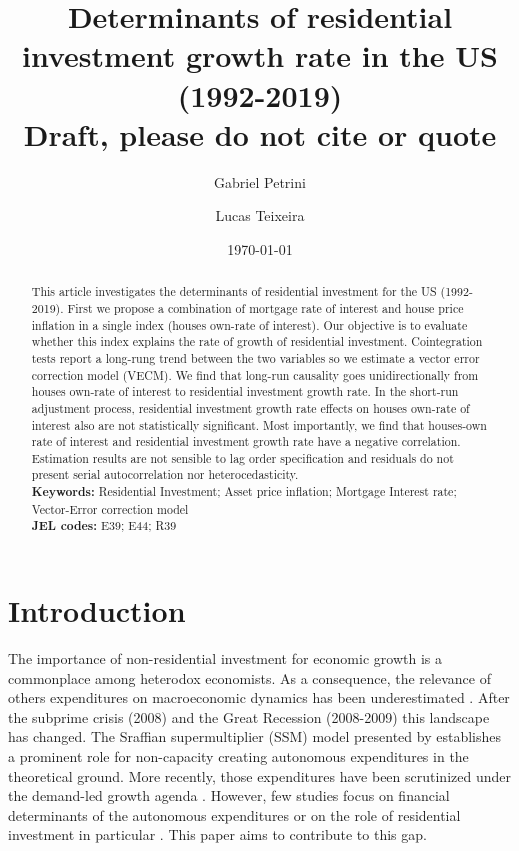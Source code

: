 \documentclass[12pt, a4paper]{article}
\author[1]{Gabriel Petrini}
\affil[1]{PhD Student at University of Campinas (Brazil), Email: \url{gpetrinidasilveira@gmail.com}} %
\author[2]{Lucas Teixeira}
\affil[2]{Assistant Professor at University of Campinas (Brazil), Email: \url{lucastei@unicamp.br}} %
\date{\today}
\title{Determinants of residential investment growth rate in the US (1992-2019)\\\medskip
\large Draft, please do not cite or quote}
\begin{document}
\maketitle



\begin{abstract}
This article investigates the determinants of residential investment for the US (1992-2019).
First we propose a combination of mortgage rate of interest and house price inflation in a single index (houses own-rate of interest).
Our objective is to evaluate whether this index explains the rate of growth of residential investment.
Cointegration tests report a long-rung trend between the two variables so we estimate a vector error correction model (VECM).
We find that long-run causality goes unidirectionally from houses own-rate of interest to residential investment growth rate.
In the short-run adjustment process, residential investment growth rate effects on houses own-rate of interest also are not statistically significant.
Most importantly, we find that houses-own rate of interest and residential investment growth rate have a negative correlation.
Estimation results are not sensible to lag order specification and residuals do not present serial autocorrelation nor heterocedasticity.
\\
\noindent \textbf{Keywords:} Residential Investment; Asset price inflation; Mortgage Interest rate; Vector-Error correction model\\
\noindent \textbf{JEL codes:} E39; E44; R39
\end{abstract}


\section{Introduction}
\label{sec:orgf55e3ac}
\label{sec:Introduction}
The importance of non-residential investment for economic growth is a commonplace among heterodox economists.
As a consequence, the relevance of others expenditures on macroeconomic dynamics has been underestimated \cite{brochier_macroeconomics_2017}.
After the subprime crisis (2008) and the Great Recession (2008-2009) this landscape has changed.
The Sraffian supermultiplier (SSM) model presented by \textcite{serrano_long_1995} establishes a prominent role for non-capacity creating autonomous expenditures in the theoretical ground.
More recently, those expenditures have been scrutinized under the demand-led growth agenda \cites{freitas_pattern_2013}{girardi_long-run_2016}{girardi_autonomous_2018}{braga_investment_2018}.
However, few studies focus on financial determinants of the autonomous expenditures or on the role of residential investment in particular \cites{petrini_2021_TD}{brochier_supermultiplier_2018}.
This paper aims to contribute to this gap.
\end{document}
